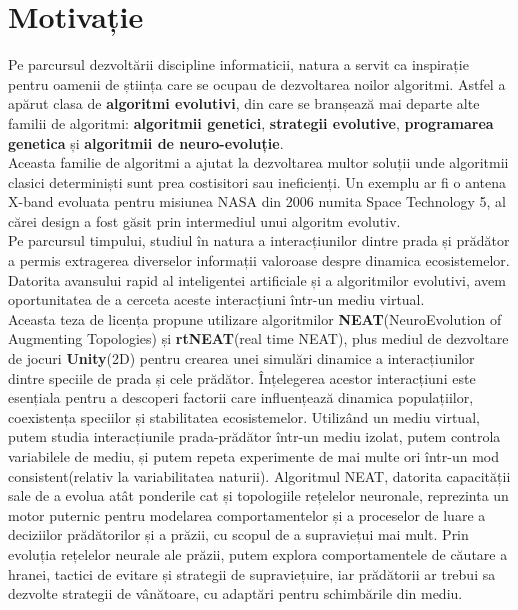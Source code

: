 \chapter*{Motivație} 

Pe parcursul dezvoltării discipline informaticii, natura a servit ca inspirație pentru oamenii de știința care se ocupau de dezvoltarea noilor algoritmi. Astfel a apărut clasa de \textbf{algoritmi evolutivi}, din care se branșează mai departe alte familii de algoritmi:
\textbf{algoritmii genetici}, \textbf{strategii evolutive}, \textbf{programarea genetica} și \textbf{algoritmii de neuro-evoluție}.\\
Aceasta familie de algoritmi a ajutat la dezvoltarea multor soluții unde algoritmii clasici determiniști sunt prea costisitori sau ineficienți. Un exemplu ar fi o antena X-band evoluata pentru misiunea NASA din 2006 numita Space Technology 5, al cărei design a fost găsit prin intermediul unui algoritm evolutiv\cite{Space2006Antenna}.\\
Pe parcursul timpului, studiul în natura a interacțiunilor dintre prada și prădător a permis extragerea diverselor informații valoroase despre dinamica ecosistemelor.
Datorita avansului rapid al inteligentei artificiale și a algoritmilor evolutivi, avem oportunitatea de a cerceta aceste interacțiuni într-un mediu virtual.\\
Aceasta teza de licența propune utilizare algoritmilor \textbf{NEAT}(NeuroEvolution of Augmenting Topologies) și \textbf{rtNEAT}(real time NEAT), plus mediul de dezvoltare de jocuri \textbf{Unity}(2D) pentru crearea unei simulări dinamice a interacțiunilor dintre speciile de prada și cele prădător. Înțelegerea acestor interacțiuni este esențiala pentru a descoperi factorii care influențează dinamica populațiilor, coexistența speciilor și stabilitatea ecosistemelor. Utilizând un mediu virtual, putem studia interacțiunile prada-prădător într-un mediu izolat, putem controla variabilele de mediu, și putem repeta experimente de mai multe ori într-un mod consistent(relativ la variabilitatea naturii).
Algoritmul NEAT, datorita capacității sale de a evolua atât ponderile cat și topologiile rețelelor neuronale, reprezinta un  motor puternic pentru modelarea comportamentelor și a proceselor de luare a deciziilor prădătorilor și a prăzii, cu scopul de a supraviețui mai mult. Prin evoluția rețelelor neurale ale prăzii, putem explora comportamentele de căutare a hranei, tactici de evitare și strategii de supraviețuire, iar prădătorii ar trebui sa dezvolte strategii de vânătoare, cu adaptări pentru schimbările din mediu.\\
